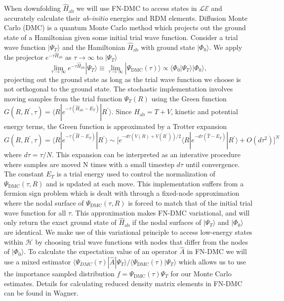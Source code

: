 \documentclass[12pt]{article}
\begin{document}
When downfolding $\hat{H}_\text{ab}$ we will use FN-DMC to access states in $\mathcal{LE}$ and accurately calculate their \textit{ab-initio} energies and RDM elements.
Diffusion Monte Carlo (DMC) is a quantum Monte Carlo method which projects out the ground state of a Hamiltonian given some initial trial wave function.
Consider a trial wave function $|\Psi_T\rangle$ and the Hamiltonian $\hat{H}_\text{ab}$ with ground state $|\Phi_0\rangle$. We apply the projector $e^{-\tau \hat{H}_\text{ab}}$ as $\tau \rightarrow \infty$ to $|\Psi_T \rangle$
\begin{equation}
\lim_{\tau \rightarrow \infty} e^{-\tau \hat{H}_\text{ab}} |\Psi_T\rangle 
\equiv \lim_{\tau \rightarrow \infty} |\Psi_\text{DMC}(\tau)\rangle \propto \langle \Phi_0|\Psi_T\rangle |\Phi_0\rangle,
\end{equation}
projecting out the ground state as long as the trial wave function we choose is not orthogonal to the ground state. 
The stochastic implementation involves moving samples from the trial function $\Psi_T(R)$ using the Green function $G(R, R^\prime, \tau) = \langle R | e^{-\tau(\hat{H}_\text{ab} - E_T)} | R^\prime \rangle$. Since $H_\text{ab} = T + V$, kinetic and potential energy terms, the Green function is approximated by a Trotter expansion $G(R, R^\prime, \tau) = \langle R | e^{-\tau(\hat{H} - E_T)} | R^\prime \rangle \sim \Big[e^{-d\tau(V(R) + V(R^\prime))/2} \langle R| e^{-d\tau(\hat{T} - E_T)}|R^\prime \rangle + O(d\tau^2) \Big]^N $ where $d\tau = \tau/N$.
This expansion can be interpreted as an interative procedure where samples are moved N times with a small timestep $d\tau$ until convergence.
The constant $E_T$ is a trial energy used to control the normalization of $\Psi_\text{DMC}(\tau, R)$ and is updated at each move.
This implementation suffers from a fermion sign problem which is dealt with through a fixed-node approximation where the nodal surface of $\Psi_\text{DMC}(\tau, R)$ is forced to match that of the initial trial wave function for all $\tau$.
This approximation makes FN-DMC variational, and will only return the exact ground state of $\hat{H}_\text{ab}$ if the nodal surfaces of $|\Psi_T\rangle$ and $|\Phi_0\rangle$ are identical.
We make use of this variational principle to access low-energy states within $\mathcal{H}$ by choosing trial wave functions with nodes that differ from the nodes of $|\Phi_0 \rangle$.
To calculate the expectation value of an operator $\hat{A}$ in FN-DMC we will use a mixed estimator $\langle \Psi_{DMC}(\tau) |\hat{A} | \Psi_T \rangle/\langle \Psi_\text{DMC}(\tau) | \Psi_T \rangle$ which allows us to use the importance sampled distribution $f = \Psi_\text{DMC}(\tau)\Psi_T$ for our Monte Carlo estimates.
Details for calculating reduced density matrix elements in FN-DMC can be found in Wagner.
\end{document}
